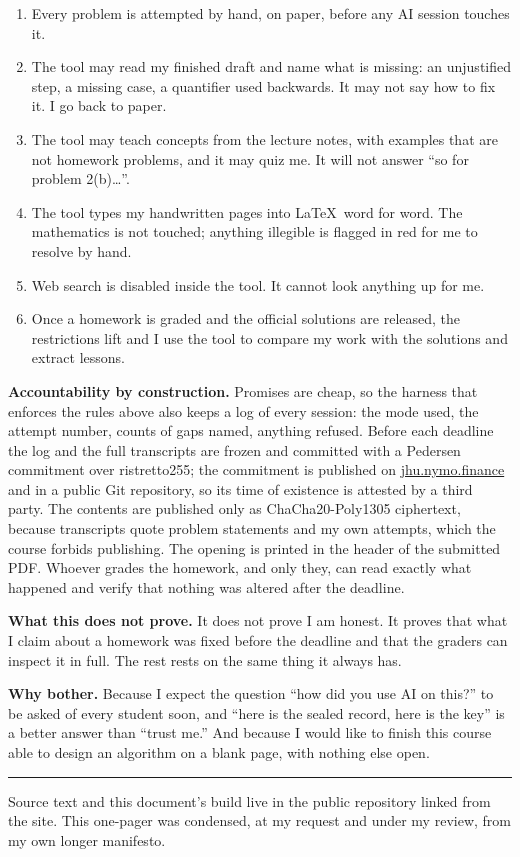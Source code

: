 \documentclass[10pt,letterpaper]{article}
\begin{document}
\begin{enumerate}[leftmargin=1.4em,itemsep=1pt,topsep=2pt]
  \item Every problem is attempted by hand, on paper, before any AI session touches it.
  \item The tool may read my finished draft and name what is missing: an unjustified step, a missing case, a quantifier used backwards. It may not say how to fix it. I go back to paper.
  \item The tool may teach concepts from the lecture notes, with examples that are not homework problems, and it may quiz me. It will not answer ``so for problem 2(b)\ldots''.
  \item The tool types my handwritten pages into \LaTeX\ word for word. The mathematics is not touched; anything illegible is flagged in red for me to resolve by hand.
  \item Web search is disabled inside the tool. It cannot look anything up for me.
  \item Once a homework is graded and the official solutions are released, the restrictions lift and I use the tool to compare my work with the solutions and extract lessons.
\end{enumerate}

\textbf{Accountability by construction.} Promises are cheap, so the harness that enforces the rules above also keeps a log of every session: the mode used, the attempt number, counts of gaps named, anything refused. Before each deadline the log and the full transcripts are frozen and committed with a Pedersen commitment over ristretto255; the commitment is published on \href{https://jhu.nymo.finance}{jhu.nymo.finance} and in a public Git repository, so its time of existence is attested by a third party. The contents are published only as ChaCha20-Poly1305 ciphertext, because transcripts quote problem statements and my own attempts, which the course forbids publishing. The opening is printed in the header of the submitted PDF. Whoever grades the homework, and only they, can read exactly what happened and verify that nothing was altered after the deadline.

\textbf{What this does not prove.} It does not prove I am honest. It proves that what I claim about a homework was fixed before the deadline and that the graders can inspect it in full. The rest rests on the same thing it always has.

\textbf{Why bother.} Because I expect the question ``how did you use AI on this?'' to be asked of every student soon, and ``here is the sealed record, here is the key'' is a better answer than ``trust me.'' And because I would like to finish this course able to design an algorithm on a blank page, with nothing else open.

\vspace{4pt}\hrule\vspace{4pt}
{\footnotesize Source text and this document's build live in the public repository linked from the site. This one-pager was condensed, at my request and under my review, from my own longer manifesto.}
\end{document}
